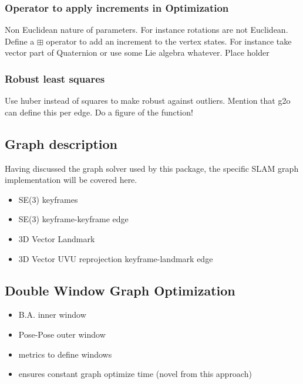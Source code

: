 \subsubsection{Operator to apply increments in Optimization}
Non Euclidean nature of parameters.  For instance rotations are not Euclidean.  Define a $\boxplus$ operator to add an increment to the vertex states.  For instance take vector part of Quaternion or use some Lie algebra whatever.  Place holder

\subsubsection{Robust least squares}
Use huber instead of squares to make robust against outliers.  Mention that g2o can define this per edge.  Do a figure of the function!

\subsection{Graph description}

Having discussed the graph solver used by this package, the specific SLAM graph implementation will be covered here.
\begin{itemize}
\itemsep0em
 \item SE(3) keyframes
 \item SE(3) keyframe-keyframe edge
 \item 3D Vector Landmark
 \item 3D Vector UVU reprojection keyframe-landmark edge
\end{itemize}

\subsection{Double Window Graph Optimization}
\begin{itemize}
\itemsep0em
 \item B.A. inner window
 \item Pose-Pose outer window
 \item metrics to define windows
 \item ensures constant graph optimize time (novel from this approach)
\end{itemize}
